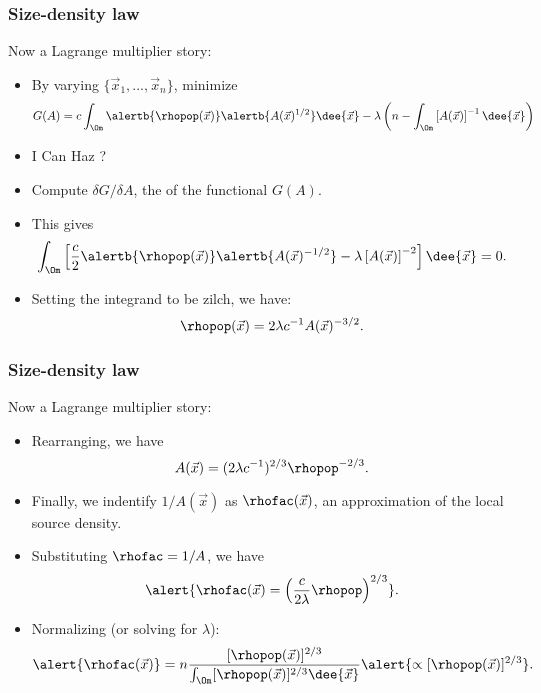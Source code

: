 \begin{frame}
  \frametitle{Size-density law}

  \begin{block}{Now a Lagrange multiplier story:}
    \begin{itemize}
    \item<1-> By varying $\{\vec{x}_1,...,\vec{x}_n\}$, minimize
      $$
      G(A) = 
      c \int_{\Om}
      \alertb{\rhopop(\vec{x})}
      \alertb{ A(\vec{x})^{1/2}}
      \dee{\vec{x}}
      -
      \lambda
      \left(n -
        \int_\Om
        \left[A(\vec{x})\right]^{-1}
        \dee{\vec{x}}
      \right)
      $$
    \item<2->
      I Can Haz
      ?
    \item<3->
      Compute
      $\delta G / \delta A$,
      the 
      of the functional $G(A)$.
    \item<4-> This gives
      $$
      \int_{\Om}
      \left[
        \frac{c}{2} \alertb{\rhopop(\vec{x})}
        \alertb{ A(\vec{x})^{-1/2}}
        -
        \lambda
        \left[A(\vec{x})\right]^{-2}
      \right]
      \dee{\vec{x}} = 0.
      $$
    \item<5-> Setting the integrand to be zilch, we have:
      $$
      \rhopop(\vec{x})
      =
      2\lambda
      c^{-1}
      A(\vec{x})^{-3/2}.
      $$
    \end{itemize}
  \end{block}

\end{frame}


\begin{frame}
  \frametitle{Size-density law}

  \begin{block}{Now a Lagrange multiplier story:}
    \begin{itemize}
    \item<1-> Rearranging, we have
      $$
      A(\vec{x}) = (2{\lambda} c^{-1})^{2/3} \rhopop^{-2/3}.
      $$
    \item<2->
      Finally, we indentify $1/A(\vec{x})$ as $\rhofac(\vec{x})$,
      an approximation of the local source density.
    \item<3-> Substituting $\rhofac=1/A$, we have
      $$
      \alert{\rhofac(\vec{x})
      = \left( 
        \frac{c}{2{\lambda}}
        \rhopop
    \right)^{2/3}}.
      $$
    \item<4-> Normalizing (or solving for $\lambda$):
      $$
      \alert{\rhofac(\vec{x})}
      =  n 
      \frac{[\rhopop(\vec{x})]^{2/3}}
      {\int_{\Om} [\rhopop(\vec{x})]^{2/3} \dee{\vec{x}}}
      \alert{\propto [\rhopop(\vec{x})]^{2/3}}.
      $$
    \end{itemize}
  \end{block}

\end{frame}

